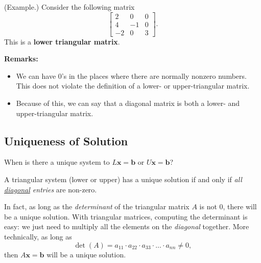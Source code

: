 \documentclass[letterpaper]{article}
\newcommand{\0}{\mathbf{0}}
\renewcommand{\b}{\mathbf{b}}
\newcommand{\x}{\mathbf{x}}
\begin{document}
\begin{mdframed}
    (Example.) Consider the following matrix \[\begin{bmatrix}
        2 & 0 & 0 \\ 
        4 & -1 & 0 \\ 
        -2 & 0 & 3
    \end{bmatrix}.\]
    This is a \textbf{lower triangular matrix}. 
\end{mdframed}
\textbf{Remarks:} 
\begin{itemize}
    \item We can have 0's in the places where there are normally nonzero numbers. This does not violate the definition of a lower- or upper-triangular matrix. 
    \item Because of this, we can say that a diagonal matrix is both a lower- and upper-triangular matrix.
\end{itemize} 

\subsection{Uniqueness of Solution}
When is there a unique system to $L\x = \b$ or $U\x = \b$? 

\begin{mdframed}
    A triangular system (lower or upper) has a unique solution if and only if \emph{all \underline{diagonal} entries} are non-zero.
\end{mdframed}

In fact, as long as the \emph{determinant} of the triangular matrix $A$ is not 0, there will be a unique solution. With triangular matrices, computing the determinant is easy: we just need to multiply all the elements on the \emph{diagonal} together. More technically, as long as 
\[\det(A) = a_{11} \cdot a_{22} \cdot a_{33} \cdot \hdots \cdot a_{nn} \neq 0,\]
then $A\x = \b$ will be a unique solution.
\end{document}
